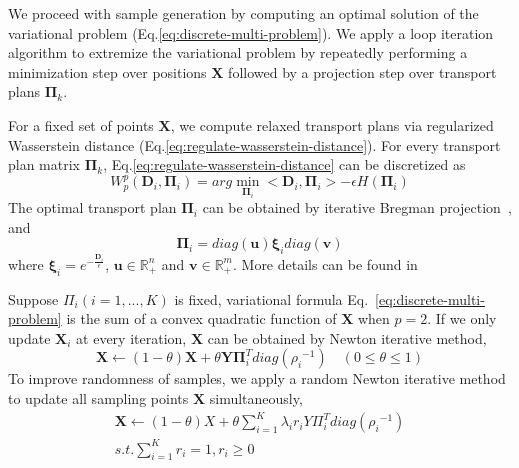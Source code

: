  We proceed with sample generation by computing an optimal solution of the variational problem (Eq.\ref{eq:discrete-multi-problem}).
 We apply a loop iteration algorithm to extremize the variational problem by repeatedly performing a minimization step over positions $\mathbf{X}$ followed by a projection step over transport plans $\mathbf{\Pi}_k$.

 For a fixed set of points $\mathbf X$,
 we compute  relaxed transport plans via regularized Wasserstein distance (Eq.\ref{eq:regulate-wasserstein-distance}).
 For every transport plan matrix $\mathbf{\Pi}_k$,
 Eq.\ref{eq:regulate-wasserstein-distance} can be discretized as
 \begin{equation}\label{eq:discrete-regulate-wasserstein-barycenter}
   W_p^p(\mathbf{D}_i,\mathbf{\Pi}_i)=arg\min\limits_{\mathbf{\Pi}_i}<\mathbf{D}_i,\mathbf{\Pi}_i>-\epsilon H(\mathbf{\Pi}_i)
 \end{equation}
The optimal transport plan $\mathbf{\Pi}_i$ can be obtained by iterative Bregman projection~\cite{cuturi:2013:sinkhorn,benamou:2015:iterative}, and
\begin{equation}\label{eq:transport-plan}
  \mathbf{\Pi}_i=diag(\mathbf{u})\mathbf{\xi}_idiag(\mathbf{v})
\end{equation}
where $\mathbf{\xi}_i=e^{-\frac{\mathbf{D}_i}{\epsilon}}$,
$\mathbf{u}\in \mathbb{R}_+^{n}$ and $\mathbf{v}\in\mathbb{R}_+^{m}$.
More details can be found in~\cite{cuturi:2013:sinkhorn,cuturi:2013:fast,benamou:2015:iterative}



Suppose $\Pi_i(i=1,...,K)$ is fixed,
variational formula Eq.~\ref{eq:discrete-multi-problem}
is the sum of a convex quadratic function of $\mathbf{X}$ when $p=2$.
If we only update $\mathbf{X}_i$ at every iteration,
$\mathbf{X}$ can be obtained by Newton iterative method,
\begin{equation}\label{eq:position-iterative}
  \mathbf{X}\leftarrow(1-\theta)\mathbf{X}+\theta\mathbf{Y}\mathbf{\Pi}_i^T diag({\rho_i}^{-1}) \quad (0\leq\theta\leq 1)
\end{equation}
To improve randomness of samples,
we apply a random Newton iterative method to update all sampling points $\mathbf{X}$ simultaneously,
\begin{equation}
\begin{split}
\mathbf{X}\leftarrow(1-\theta)X+\theta\sum_{i=1}^K\lambda_ir_iY\Pi_i^Tdiag({\rho_i}^{-1})\\
 s.t. \sum\limits_{i=1}^{K}r_i=1, r_i\geq 0
 \end{split}
\end{equation}

